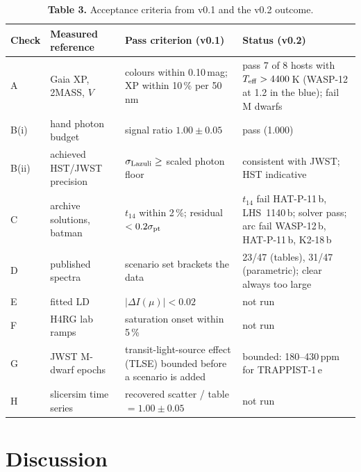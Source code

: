 \documentclass[11pt]{article}
\begin{document}
\begin{table}[H]
\centering\small
\begin{tabularx}{\linewidth}{@{}l p{3.0cm} p{3.6cm} X@{}}
\toprule
\textbf{Check} & \textbf{Measured reference} & \textbf{Pass criterion (v0.1)} & \textbf{Status (v0.2)} \\
\midrule
A & Gaia XP, 2MASS, $V$ & colours within 0.10\,mag; XP within 10\,\% per 50\,nm & pass 7 of 8 hosts with $T_{\rm eff}>4400$\,K (WASP-12 at 1.2 in the blue); fail M dwarfs \\
B(i) & hand photon budget & signal ratio $1.00\pm0.05$ & pass (1.000) \\
B(ii) & achieved HST/JWST precision & $\sigma_{\rm Lazuli}\ge$ scaled photon floor & consistent with JWST; HST indicative \\
C & archive solutions, batman & $t_{14}$ within 2\,\%; residual $<0.2\sigma_{\rm pt}$ & $t_{14}$ fail HAT-P-11\,b, LHS~1140\,b; solver pass; arc fail WASP-12\,b, HAT-P-11\,b, K2-18\,b \\
D & published spectra & scenario set brackets the data & 23/47 (tables), 31/47 (parametric); clear always too large \\
E & fitted LD & $|\Delta I(\mu)|<0.02$ & not run \\
F & H4RG lab ramps & saturation onset within 5\,\% & not run \\
G & JWST M-dwarf epochs & transit-light-source effect (TLSE) bounded before a scenario is added & bounded: 180--430\,ppm for TRAPPIST-1\,e \\
H & slicersim time series & recovered scatter / table $=1.00\pm0.05$ & not run \\
\bottomrule
\end{tabularx}
\caption*{\footnotesize\textbf{Table 3.} Acceptance criteria from v0.1 and the v0.2 outcome.}
\end{table}

\section*{Discussion}
\end{document}
